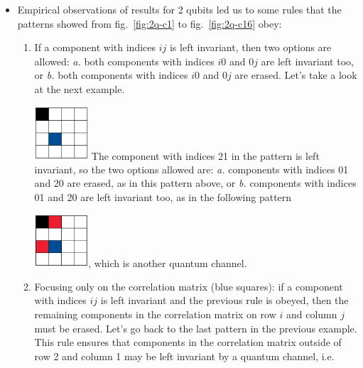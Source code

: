 \documentclass[11pt,dvipsnames]{article} %
\newcommand{\fref}[1]{fig.~\ref{#1}}  \newcommand{\tref}[1]{table~\ref{#1}}
\newcommand{\h}[1]{\colorbox{Yellow}{#1}}
\newcommand{\1}{\mathds{1}}
\begin{document}
\begin{itemize}
\item Empirical observations of results for 2 qubits 
led us to some rules that the
patterns showed from \fref{fig:2q-c1} to \fref{fig:2q-c16} obey:
\begin{enumerate}
\item If a component with indices $ij$ is left invariant, then two options are
allowed: \textit{a.} both components with indices $i0$ and $0j$ are left
invariant too, or \textit{b.} both components with indices $i0$ and $0j$ are
erased.
\janote{\h{Inicio}}
Let's take a look at the next example. \newline

\hfill
\includegraphics[width=2cm]{img/ex-2q2c-empiricalRule}
\hfill \hfill
\newline
The component with indices 21 in the pattern is left invariant,
so the two options allowed are: \textit{a.} components with indices 01 and
20 are erased, as in this pattern above, or \textit{b.} components 
with indices 01 and 20 are left invariant too, 
as in the following pattern \newline

\hfill
\includegraphics[width=2cm]{img/ex-2q4c-empiricalRule},
\hfill \hfill 
\newline
which is another quantum channel.

\item Focusing only on the correlation matrix (blue squares): if a component
with indices $ij$ is left invariant and the previous rule is obeyed, then the
remaining components in the correlation matrix on row $i$ and column $j$ must
be erased. 
Let's go back to the last pattern in the previous example. This rule 
ensures that components in the correlation matrix outside of row 2 and 
column 1 may be left invariant by a quantum channel, i.e.\newline


\end{enumerate}
\end{itemize}
\end{document}
